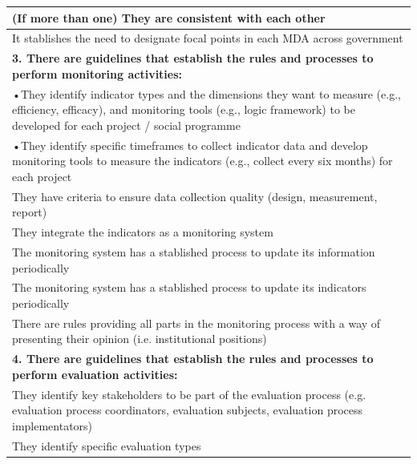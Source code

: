 \documentclass[
  10pt,
]{book}
\begin{document}
\begin{table}
\begin{tabular}[t]{l}
\hline
\hspace{1em}(If more than one) They are consistent with each other\\
\hline
\hspace{1em}It stablishes the need to designate focal points in each MDA across government\\
\hline
\multicolumn{1}{l}{\textbf{3. There are guidelines that establish the rules and processes to perform monitoring activities:}}\\
\hline
\hspace{1em}•They identify indicator types and the dimensions they want to measure (e.g., efficiency, efficacy), and monitoring tools (e.g., logic framework) to be developed for each project / social programme\\
\hline
\hspace{1em}•They identify specific timeframes to collect indicator data and develop monitoring tools to measure the indicators (e.g., collect every six months) for each project\\
\hline
\hspace{1em}They have criteria to ensure data collection quality (design, measurement, report)\\
\hline
\hspace{1em}They integrate the indicators as a monitoring system\\
\hline
\hspace{1em}The monitoring system has a stablished process to update its information periodically\\
\hline
\hspace{1em}The monitoring system has a stablished process to update its indicators periodically\\
\hline
\hspace{1em}There are rules providing all parts in the monitoring process with a way of presenting their opinion (i.e. institutional positions)\\
\hline
\multicolumn{1}{l}{\textbf{4. There are guidelines that establish the rules and processes to perform evaluation activities:}}\\
\hline
\hspace{1em}They identify key stakeholders  to be part of the evaluation process (e.g. evaluation process coordinators, evaluation subjects, evaluation process implementators)\\
\hline
\hspace{1em}They identify specific evaluation types\\

\end{tabular}
\end{table}
\end{document}
